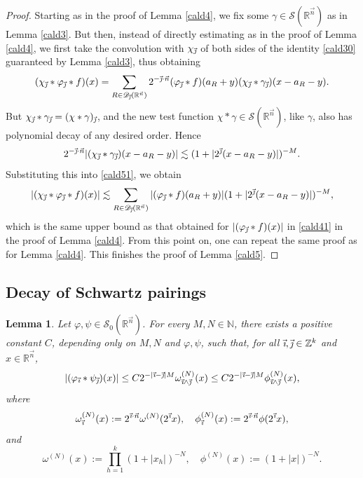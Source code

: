 \documentclass[11pt, reqno]{amsart}
\newtheorem{lemma}[theorem]{Lemma}
\theoremstyle{definition}
\theoremstyle{remark}
\numberwithin{equation}{section}
\newcommand{\D}{\mathscr D}
\newcommand{\R}{\mathbb R}
\newcommand{\Sc}{\mathscr S}
\newcommand{\Z}{\mathbb Z}
\newcommand{\vi}{\vec{\textit{\i}}}
\newcommand{\vj}{\vec{\textit{\j}}}
\newcommand{\vn}{\vec n}
\newcommand{\abs}[1]{|#1|}
\begin{document}
\begin{proof}
Starting as in the proof of Lemma \ref{cald4}, we fix some $\gamma\in\Sc(\R^{\vn})$ as in Lemma \ref{cald3}. But then, instead of directly estimating as in the proof of Lemma \ref{cald4}, we first take the convolution with $\chi_{\vj}$ of both sides of the identity \eqref{cald30} guaranteed by Lemma \ref{cald3}, thus obtaining
\begin{equation}\label{cald51}
(\chi_{\vj}*\varphi_{\vj}*f)(x)
=\sum_{R\in\D_{\vj}(\R^{\vn})}2^{-\vj\cdot\vn}(\varphi_{\vj}*f)(a_R+y)
(\chi_{\vj}*\gamma_{\vj})(x-a_R-y).
\end{equation}
But $\chi_{\vj}*\gamma_{\vj}=(\chi*\gamma)_{\vj}$, and the new test function $\chi*\gamma\in\Sc(\R^{\vn})$, like $\gamma$, also has polynomial decay of any desired order. Hence
\begin{equation*}
2^{-\vj\cdot\vn}\abs{(\chi_{\vj}*\gamma_{\vj})(x-a_R-y)}
\lesssim(1+\abs{2^{\vj}(x-a_R-y)})^{-M}.
\end{equation*}
Substituting this into \eqref{cald51}, we obtain
\begin{equation*}
\abs{(\chi_{\vj}*\varphi_{\vj}*f)(x)}
\lesssim\sum_{R\in\D_{\vj}(\R^{\vn})}\abs{(\varphi_{\vj}*f)(a_R+y)} (1+\abs{2^{\vj}(x-a_R-y)})^{-M},
\end{equation*}
which is the same upper bound as that obtained for $\abs{(\varphi_{\vj}*f)(x)}$ in \eqref{cald41} in the proof of Lemma \ref{cald4}. From this point on, one can repeat the same proof as for Lemma \ref{cald4}.
This finishes the proof of Lemma \ref{cald5}.
\end{proof}

\subsection{Decay of Schwartz pairings}

\begin{lemma}\label{59}
Let $\varphi,\psi\in\Sc_0(\R^{\vn})$.
For every $M,N\in\mathbb{N}$, there exists a positive constant $C$,
depending only on $M,N$ and $\varphi,\psi$, such that,
for all $\vi,\vj\in\Z^k$ and $x\in\R^{\vn}$,
\begin{equation*}
\abs{(\varphi_{\vi}*\psi_{\vj})(x)}
\leq C2^{-\abs{\vi-\vj}M}\omega_{\vi\wedge\vj}^{(N)}(x)
\leq C2^{-\abs{\vi-\vj}M}\phi_{\vi\wedge\vj}^{(N)}(x),
\end{equation*}
where
\begin{equation*}
\omega_{\vi}^{(N)}(x):=2^{\vi\cdot\vn}\omega^{(N)}(2^{\vi}x),\quad
\phi_{\vi}^{(N)}(x):=2^{\vi\cdot\vn}\phi(2^{\vi}x),
\end{equation*}
and
\begin{equation*}
\omega^{(N)}(x):=\prod_{h=1}^k(1+\abs{x_h})^{-N},
\quad\phi^{(N)}(x):=(1+\abs{x})^{-N}.
\end{equation*}
\end{lemma}
\end{document}
